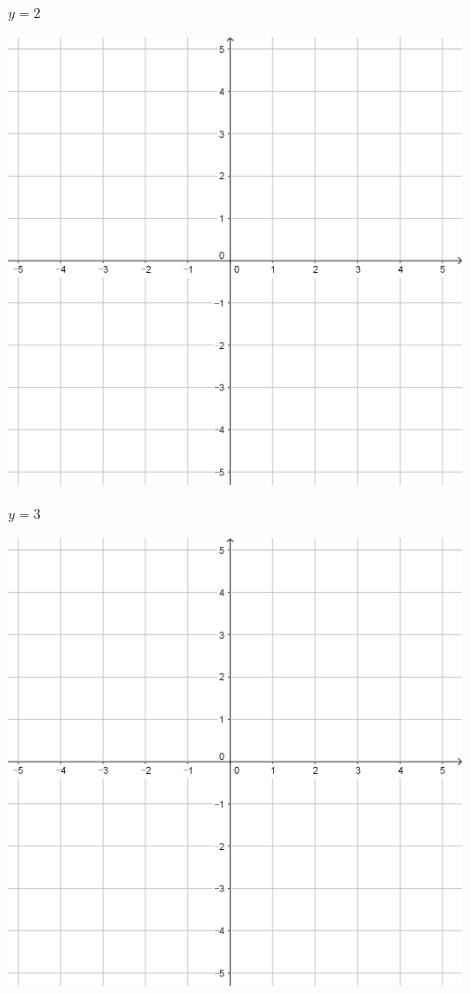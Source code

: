 \documentclass[a4paper]{oblivoir}
\begin{document}
\begin{minipage}{0.45\textwidth}\centering
\(y=2\)
\par\bigskip\includegraphics[width=0.9\textwidth]{55}
\end{minipage}
\begin{minipage}{0.45\textwidth}\centering
\(y=3\)
\par\bigskip\includegraphics[width=0.9\textwidth]{55}
\end{minipage}\bigskip\bigskip\par
\end{document}
